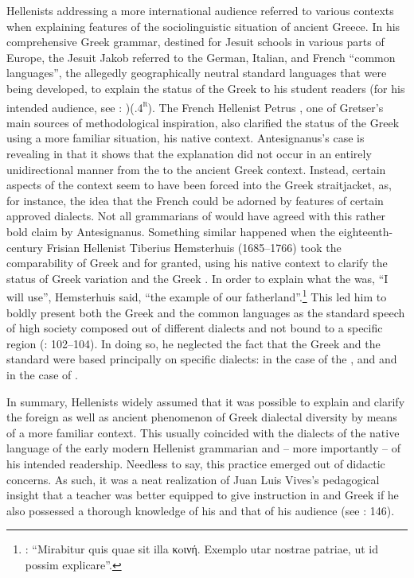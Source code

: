 Hellenists addressing a more international audience referred to various  contexts when explaining features of the sociolinguistic situation of ancient Greece. In his comprehensive Greek grammar, destined for Jesuit schools in various parts of Europe, the Jesuit Jakob \citet[20]{Gretser1593} referred to the German, Italian, and French “common languages”, the allegedly geographically neutral standard languages that were being developed, to explain the status of the Greek  to his student readers (for his intended audience, see \citealt{Gretser1593}: {\footnotesize{)(}}.4\textsc{\textsuperscript{r}}). The French Hellenist Petrus \citet[11--12]{Antesignanus1554}, one of Gretser’s main sources of methodological inspiration, also clarified the status of the Greek  using a more familiar situation, his native  context. Antesignanus’s case is revealing in that it shows that the explanation did not occur in an entirely unidirectional manner from the  to the ancient Greek context. Instead, certain aspects of the  context seem to have been forced into the Greek straitjacket, as, for instance, the idea that the French  could be adorned by features of certain approved  dialects. Not all grammarians of  would have agreed with this rather bold claim by Antesignanus. Something similar happened when the eighteenth-century Frisian Hellenist Tiberius Hemsterhuis (1685–1766) took the comparability of Greek and  for granted, using his native context to clarify the status of Greek variation and the Greek . In order to explain what the  was, “I will use”, Hemsterhuis said, “the example of our fatherland”.\footnote{\citet[102]{Hemsterhuis2015}: “Mirabitur quis quae sit illa κoινή. Exemplo utar nostrae patriae, ut id possim explicare”.} This led him to boldly present both the Greek and the  common languages as the standard speech of high society composed out of different dialects and not bound to a specific region (\citealt{Hemsterhuis2015}: 102–104). In doing so, he neglected the fact that the Greek  and the  standard were based principally on specific dialects:  in the case of the , and  and  in the case of .

In summary, Hellenists widely assumed that it was possible to explain and clarify the foreign as well as ancient phenomenon of Greek dialectal diversity by means of a more familiar context. This usually coincided with the dialects of the native language of the early modern Hellenist grammarian and – more importantly – of his intended readership. Needless to say, this practice emerged out of didactic concerns. As such, it was a neat realization of Juan Luis Vives’s pedagogical insight that a teacher was better equipped to give instruction in  and Greek if he also possessed a thorough knowledge of his  and that of his audience (see \citealt{Padley1985}: 146).

